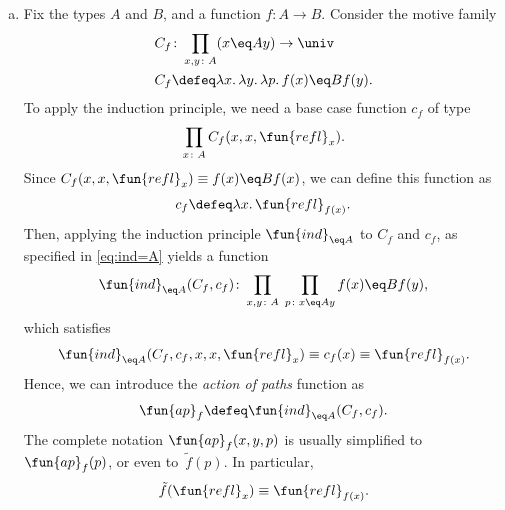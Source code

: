 \begin{solution}
    \begin{enumerate}[a)]
        \item Fix the types $A$ and $B$, and a function $f\colon A\to B$. Consider the motive family
        \begin{align*}
            C_f&\colon\prod_{x,y\colon A}(x\eq Ay)\to\univ\\
            C_f&\defeq\lambda x.\,\lambda y.\,\lambda p.\,f(x)\eq Bf(y).
        \end{align*}
        To apply the induction principle, we need a base case function $c_f$ of type
        \[
             \prod_{x\colon A} C_f(x,x,\fun{refl}_x).
        \]
        Since $C_f(x,x,\fun{refl}_x) \equiv f(x)\eq B f(x)$, we can define this function as
        \[
            c_f \defeq \lambda x.\,\fun{refl}_{f(x)}.
        \]
        Then, applying the induction principle $\fun{ind}_{\eq A}$  to $C_f$ and $c_f$, as specified in \eqref{eq:ind=A} yields a function
        \begin{align*}
            \fun{ind}_{\eq A}(C_f,c_f)\colon
                \prod_{x,y\colon A}\;\prod_{p\colon x\eq Ay}f(x)\eq Bf(y),
        \end{align*}
        which satisfies
        \[
            \fun{ind}_{\eq A}(C_f,c_f,x,x,\fun{refl}_x)
            \equiv c_f(x)
            \equiv \fun{refl}_{f(x)}.
        \]
        Hence, we can introduce the \textsl{action of paths} function as
        \[
            \fun{ap}_f\defeq\fun{ind}_{\eq A}(C_f,c_f).
        \]
        The complete notation $\fun{ap}_f(x,y,p)$ is usually simplified to $\fun{ap}_f(p)$, or even to~$\tilde f(p)$. In particular, 
        \[
            \tilde f(\fun{refl}_x)\equiv \fun{refl}_{f(x)}.
        \]
    

\end{enumerate}
\end{solution}
